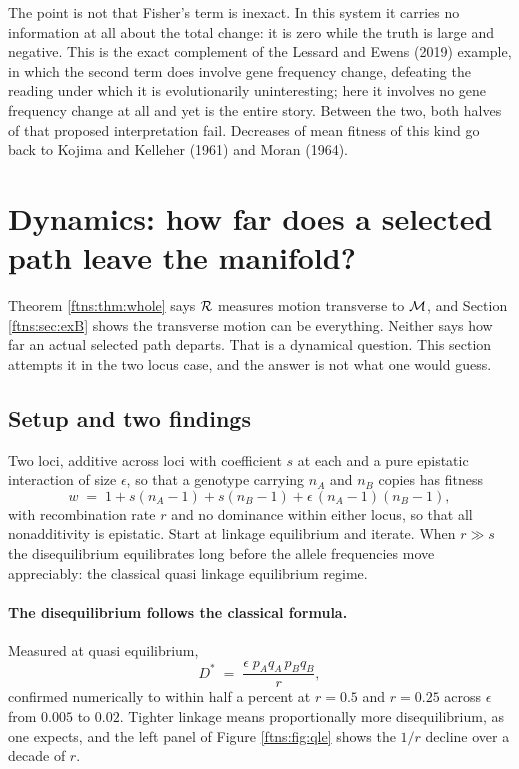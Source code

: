 The point is not that Fisher's term is inexact. In this system it carries no information at all
about the total change: it is zero while the truth is large and negative. This is the exact
complement of the Lessard and Ewens (2019) example, in which the second term does involve gene
frequency change, defeating the reading under which it is evolutionarily uninteresting; here it
involves no gene frequency change at all and yet is the entire story. Between the two, both halves
of that proposed interpretation fail. Decreases of mean fitness of this kind go back to Kojima and
Kelleher (1961) and Moran (1964).

\section{Dynamics: how far does a selected path leave the manifold?}
\label{ftns:sec:qle}

Theorem \ref{ftns:thm:whole} says $\mathcal{R}$ measures motion transverse to $\mathcal{M}$, and Section \ref{ftns:sec:exB}
shows the transverse motion can be everything. Neither says how far an actual selected path
departs. That is a dynamical question. This section attempts it in the two locus case, and the
answer is not what one would guess.

\subsection{Setup and two findings}

Two loci, additive across loci with coefficient $s$ at each and a pure epistatic interaction of
size $\epsilon$, so that a genotype carrying $n_A$ and $n_B$ copies has fitness
\[
w \;=\; 1+s(n_A-1)+s(n_B-1)+\epsilon\,(n_A-1)(n_B-1) ,
\]
with recombination rate $r$ and no dominance within either locus, so that all nonadditivity is
epistatic. Start at linkage equilibrium and iterate. When $r\gg s$ the disequilibrium equilibrates
long before the allele frequencies move appreciably: the classical quasi linkage equilibrium
regime.

\paragraph{The disequilibrium follows the classical formula.} Measured at quasi equilibrium,
\begin{equation}
D^\ast \;=\; \frac{\epsilon\;p_Aq_A\,p_Bq_B}{r} ,
\label{ftns:eq:Dstar}
\end{equation}
confirmed numerically to within half a percent at $r=0.5$ and $r=0.25$ across $\epsilon$ from
$0.005$ to $0.02$. Tighter linkage means proportionally more disequilibrium, as one expects, and
the left panel of Figure \ref{ftns:fig:qle} shows the $1/r$ decline over a decade of $r$.

